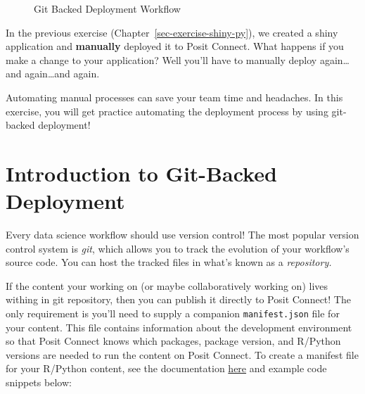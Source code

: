 \documentclass[
  letterpaper,
  DIV=11,
  numbers=noendperiod]{scrreprt}
\begin{document}
\begin{figure}


\caption{\label{fig-git-backed-workflow}Git Backed Deployment Workflow}

\end{figure}%

In the previous exercise (Chapter~\ref{sec-exercise-shiny-py}), we
created a shiny application and \textbf{manually} deployed it to Posit
Connect. What happens if you make a change to your application? Well
you'll have to manually deploy again\ldots and again\ldots and again.

Automating manual processes can save your team time and headaches. In
this exercise, you will get practice automating the deployment process
by using git-backed deployment!

\section{Introduction to Git-Backed
Deployment}\label{introduction-to-git-backed-deployment}

Every data science workflow should use version control! The most popular
version control system is \emph{git}, which allows you to track the
evolution of your workflow's source code. You can host the tracked files
in what's known as a \emph{repository.}

If the content your working on (or maybe collaboratively working on)
lives withing in git repository, then you can publish it directly to
Posit Connect! The only requirement is you'll need to supply a companion
\texttt{manifest.json} file for your content. This file contains
information about the development environment so that Posit Connect
knows which packages, package version, and R/Python versions are needed
to run the content on Posit Connect. To create a manifest file for your
R/Python content, see the documentation
\href{https://docs.posit.co/connect/user/git-backed/}{here} and example
code snippets below:
\end{document}
